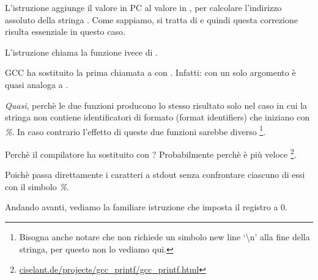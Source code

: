 L'istruzione  aggiunge il valore in \ac{PC} al valore in , per calcolare l'indirizzo assoluto della stringa .
Come sappiamo, si tratta di \q{\PICcode} e quindi questa correzione risulta essenziale in questo caso.

L'istruzione  chiama la funzione \puts ivece di \printf.

\label{puts}

GCC ha sostituito la prima chiamata a \printf con \puts.
Infatti: \printf con un solo argomento è quasi analoga a \puts.

\emph{Quasi}, perchè le due funzioni producono lo stesso risultato solo nel caso in cui la stringa non contiene
identificatori di formato (format identifiers) che iniziano con \emph{\%}.
In caso contrario l'effetto di queste due funzioni sarebbe diverso
\footnote{Bisogna anche notare che \puts non richiede un simbolo new line `\textbackslash{}n' alla fine della stringa,
per questo non lo vediamo qui.}.

Perchè il compilatore ha sostituito \printf con \puts? Probabilmente perchè \puts è più veloce
\footnote{\href{http://go.yurichev.com/17063}{ciselant.de/projects/gcc\_printf/gcc\_printf.html}}.

Poichè passa direttamente i caratteri a \gls{stdout} senza confrontare ciascuno di essi con il simbolo \emph{\%}.

Andando avanti, vediamo la familiare istruzione  che imposta il registro  a 0.
